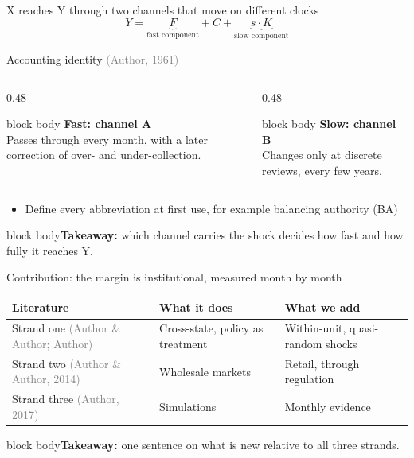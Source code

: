 \documentclass[aspectratio=169,10pt]{beamer}
\newcommand{\takeaway}[1]{\vfill\begin{beamercolorbox}[sep=5pt]{block body}\small\textbf{Takeaway:} #1\end{beamercolorbox}}
\newcommand{\citeg}[1]{\textcolor{gray}{(#1)}}
\begin{document}
\begin{frame}{X reaches Y through two channels that move on different clocks}
\[
Y = \underbrace{F}_{\text{fast component}} + C + \underbrace{s \cdot K}_{\text{slow component}}
\]
\vspace{-0.4em}
{\centering\scriptsize Accounting identity \citeg{Author, 1961}\par}
\vspace{0.3em}
\begin{columns}[T]
\begin{column}{0.48\textwidth}
\begin{beamercolorbox}[sep=5pt]{block body}
\textbf{Fast: channel A}\\[2pt]
\small Passes through every month, with a later correction of over- and under-collection.
\end{beamercolorbox}
\end{column}
\begin{column}{0.48\textwidth}
\begin{beamercolorbox}[sep=5pt]{block body}
\textbf{Slow: channel B}\\[2pt]
\small Changes only at discrete reviews, every few years.
\end{beamercolorbox}
\end{column}
\end{columns}
\vspace{0.5em}
\begin{itemize}\small
\item Define every abbreviation at first use, for example balancing authority (BA)
\end{itemize}
\takeaway{which channel carries the shock decides how fast and how fully it reaches Y.}
\end{frame}

\begin{frame}{Contribution: the margin is institutional, measured month by month}
\small
\begin{tabular}{@{}>{\raggedright\arraybackslash}p{4.4cm}>{\raggedright\arraybackslash}p{4.2cm}>{\raggedright\arraybackslash}p{4.4cm}@{}}
\toprule
Literature & What it does & What we add \\
\midrule
Strand one \citeg{Author \& Author; Author} & Cross-state, policy as treatment & Within-unit, quasi-random shocks \\
Strand two \citeg{Author \& Author, 2014} & Wholesale markets & Retail, through regulation \\
Strand three \citeg{Author, 2017} & Simulations & Monthly evidence \\
\bottomrule
\end{tabular}
\takeaway{one sentence on what is new relative to all three strands.}
\end{frame}
\end{document}
